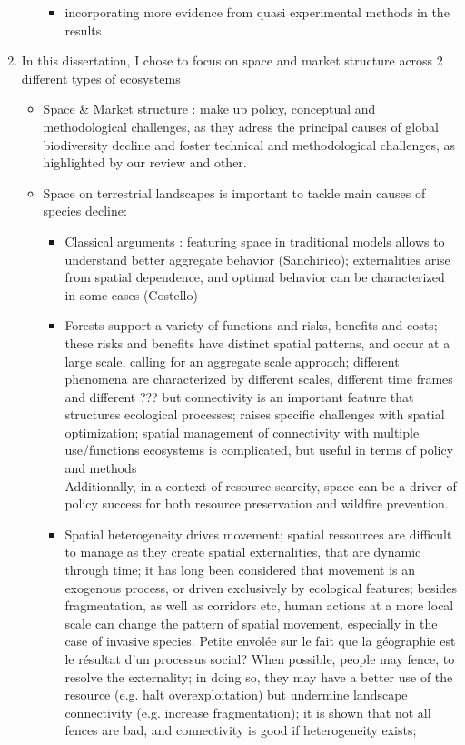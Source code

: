 \begin{enumerate}
\begin{itemize}
\begin{itemize}
\item incorporating more evidence from quasi experimental methods in the results
\end{itemize}
\end{itemize}
\item In this dissertation, I chose to focus on space and market structure across 2 different types of ecosystems
\begin{itemize}
\item Space \& Market structure : make up policy, conceptual and methodological challenges, as they adress the principal causes of global biodiversity decline and foster technical and methodological challenges, as highlighted by our review and other. 
\item Space on terrestrial landscapes is important to tackle main causes of species decline: 
\begin{itemize}
\item Classical arguments : featuring space in traditional models allows to understand better aggregate behavior (Sanchirico); externalities arise from spatial dependence, and optimal behavior can be characterized in some cases (Costello)

\item Forests support a variety of functions and risks, benefits and costs; these risks and benefits have distinct spatial patterns, and occur at a large scale, calling for an aggregate scale approach; different phenomena are characterized by different scales, different time frames and different ??? but connectivity is an important feature that structures ecological processes; raises specific challenges with spatial optimization; spatial management of connectivity with multiple use/functions ecosystems is complicated, but useful in terms of policy and methods\\
Additionally, in a context of resource scarcity, space can be a driver of policy success for both resource preservation and wildfire prevention. 
\item Spatial heterogeneity drives movement; spatial ressources are difficult to manage as they create spatial externalities, that are dynamic through time; it has long been considered that movement is an exogenous process, or driven exclusively by ecological features; besides fragmentation, as well as corridors etc, human actions at a more local scale can change the pattern of spatial movement, especially in the case of invasive species. Petite envolée sur le fait que la géographie est le résultat d'un processus social? When possible, people may fence, to resolve the externality; in doing so, they may have a better use of the resource (e.g. halt overexploitation) but undermine landscape connectivity (e.g. increase fragmentation); it is shown that not all fences are bad, and connectivity is good if heterogeneity exists; 


\end{itemize}
\end{itemize}
\end{enumerate}
